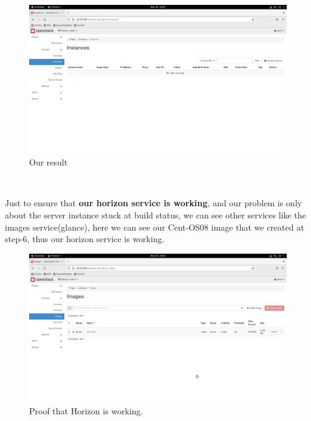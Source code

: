 \begin{spacing}{1.2}
\begin{figure}[!htb] 
\begin{center} 
\includegraphics[width=1\linewidth]{Cloud/Configure Horizon/C_9_our result because our instance is always stuck at building state.png} 
\end{center} 
\caption{  Our result} 
\end{figure} 
\FloatBarrier
\\

\par Just to ensure that \textbf{our horizon service is working}, and our problem is only about the server instance stuck at build status, we can see other services like the images service(glance), here we can see our Cent-OS08 image that we created at step-6, thus our horizon service is working.
\\
\begin{figure}[!htb] 
\begin{center} 
\includegraphics[width=1\linewidth]{Cloud/Configure Horizon/C_9_proof of correctness since we can see the images we created we can say that horizon service is working.png} 
\end{center} 
\caption{  Proof that Horizon is working.} 
\end{figure} 
\FloatBarrier
\\


\end{spacing}

